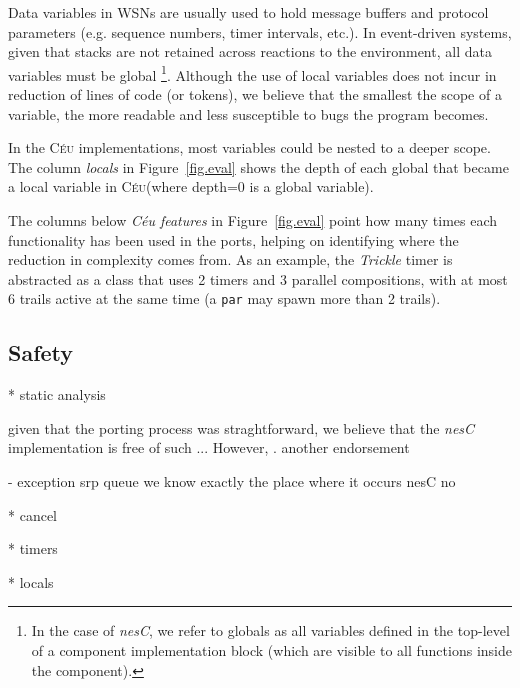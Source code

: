 \documentclass[10pt]{sensys-proc}
\newcommand{\CEU}{\textsc{C\'{e}u}\xspace}
\newcommand{\code}[1] {{\small{\texttt{#1}}}}
\begin{document}
Data variables in WSNs are usually used to hold message buffers and protocol 
parameters (e.g. sequence numbers, timer intervals, etc.).
In event-driven systems, given that stacks are not retained across reactions to 
the environment, all data variables must be global%
\footnote{In the case of \emph{nesC}, we refer to globals as all variables 
defined in the top-level of a component implementation block (which are visible 
to all functions inside the component).}.
Although the use of local variables does not incur in reduction of lines of 
code (or tokens), we believe that the smallest the scope of a variable, the 
more readable and less susceptible to bugs the program becomes.

In the \CEU implementations, most variables could be nested to a deeper scope.
The column \emph{locals} in Figure~\ref{fig.eval} shows the depth of each 
global that became a local variable in \CEU (where depth=0 is a global 
variable).

The columns below \emph{C\'eu features} in Figure~\ref{fig.eval} point how many 
times each functionality has been used in the ports, helping on identifying 
where the reduction in complexity comes from.
As an example, the \emph{Trickle} timer is abstracted as a class that uses 2 
timers and 3 parallel compositions, with at most 6 trails active at the same 
time (a \code{par} may spawn more than 2 trails).


\subsection{Safety}

* static analysis

given that the porting process was straghtforward, we believe that the 
\emph{nesC} implementation is free of such ...
However, .
another endorsement

- exception srp queue
we know exactly the place where it occurs
nesC no

* cancel

* timers

* locals


\end{document}

